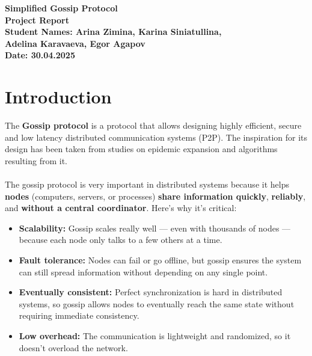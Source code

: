 \documentclass[a4paper,12pt]{article}
\begin{document}
\begin{titlepage}
    \centering
    {\Large \textbf{Simplified Gossip Protocol}}\\[1cm]
    \textbf{Project Report}\\[0.5cm]
    \vfill
    \textbf{Student Names: Arina Zimina, Karina Siniatullina,} \\[0.3cm]
    \textbf{Adelina Karavaeva, Egor Agapov} \\[0.5cm]
    \textbf{Date: 30.04.2025} \\[2cm]
    \vfill
\end{titlepage}

\section{Introduction}

The \textbf{Gossip protocol} is a protocol that allows designing highly efficient, secure and low latency distributed communication systems (P2P). The inspiration for its design has been taken from studies on epidemic expansion and algorithms resulting from it. \\\\
The gossip protocol is very important in distributed systems because it helps \textbf{nodes} (computers, servers, or processes) \textbf{share information quickly}, \textbf{reliably}, and \textbf{without a central coordinator}. Here's why it's critical:
\begin{itemize}
    \item \textbf{Scalability:} Gossip scales really well — even with thousands of nodes — because each node only talks to a few others at a time.
    \item \textbf{Fault tolerance:} Nodes can fail or go offline, but gossip ensures the system can still spread information without depending on any single point.
    \item \textbf{Eventually consistent:} Perfect synchronization is hard in distributed systems, so gossip allows nodes to eventually reach the same state without requiring immediate consistency.
    \item \textbf{Low overhead:} The communication is lightweight and randomized, so it doesn't overload the network.
\end{itemize}
\end{document}
